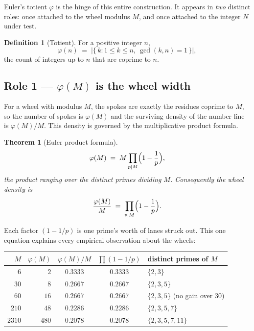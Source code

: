 \documentclass[11pt]{article}
\newtheorem{theorem}{Theorem}
\theoremstyle{definition}
\newtheorem{definition}{Definition}
\begin{document}
Euler's totient $\varphi$ is the hinge of this entire construction. It
appears in \emph{two} distinct roles: once attached to the wheel modulus
$M$, and once attached to the integer $N$ under test.

\begin{definition}[Totient]
For a positive integer $n$,
\[
\varphi(n) \;=\; \bigl|\{\, k : 1 \le k \le n,\ \gcd(k,n)=1 \,\}\bigr|,
\]
the count of integers up to $n$ that are coprime to $n$.
\end{definition}

\subsection*{Role 1 --- $\varphi(M)$ is the wheel width}

For a wheel with modulus $M$, the spokes are exactly the residues coprime
to $M$, so the number of spokes is $\varphi(M)$ and the surviving density
of the number line is $\varphi(M)/M$. This density is governed by the
multiplicative product formula.

\begin{theorem}[Euler product formula]
\[
\varphi(M) \;=\; M \prod_{p \mid M} \Bigl(1 - \frac{1}{p}\Bigr),
\]
the product ranging over the \emph{distinct} primes dividing $M$.
Consequently the wheel density is
\[
\frac{\varphi(M)}{M} \;=\; \prod_{p \mid M}\Bigl(1 - \frac1p\Bigr).
\]
\end{theorem}

Each factor $(1-1/p)$ is one prime's worth of lanes struck out. This one
equation explains every empirical observation about the wheels:

\begin{center}
\begin{tabular}{r r c c l}
\toprule
$M$ & $\varphi(M)$ & $\varphi(M)/M$ & $\prod(1-1/p)$ & distinct primes of $M$\\
\midrule
$6$    & $2$   & $0.3333$ & $0.3333$ & $\{2,3\}$\\
$30$   & $8$   & $0.2667$ & $0.2667$ & $\{2,3,5\}$\\
$60$   & $16$  & $0.2667$ & $0.2667$ & $\{2,3,5\}$ \quad(no gain over $30$)\\
$210$  & $48$  & $0.2286$ & $0.2286$ & $\{2,3,5,7\}$\\
$2310$ & $480$ & $0.2078$ & $0.2078$ & $\{2,3,5,7,11\}$\\
\bottomrule
\end{tabular}
\end{center}
\end{document}
